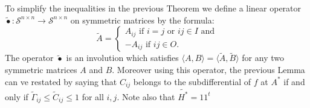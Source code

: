 \documentclass[12pt]{amsart}
\theoremstyle{remark}
\newtheorem{remark}[lemma]{Remark}
\DeclareMathOperator*{\argmin}{arg\,min}
\begin{document}





To simplify the inequalities in the previous Theorem we define a linear operator $\widetilde{\bullet}: \mathcal{S}^{n\times n}\rightarrow \mathcal{S}^{n\times n}$ on symmetric matrices by the formula:
\[ \widetilde{A} = 
\begin{cases}
A_{ij}\text{ if $i=j$ or $ij\in I$ and}\\
-A_{ij}\text{ if $ij\in O$.} 
\end{cases}
\]
The operator $\widetilde{\bullet}$ is an involution which satisfies $\langle A,B\rangle = \langle \widetilde{A}, \widetilde{B}\rangle$ for any two symmetric matrices $A$ and $B$. Moreover using this operator, the previous Lemma can ve restated by saying that $C_{ij}$ belongs to the subdifferential of $f$ at $A^*$ if and only if $\widetilde{\Gamma}_{ij}\leq \widetilde{C}_{ij}\leq 1$ for all $i,j$. Note also that $\widetilde{H^*}=11^t$
\end{document}
